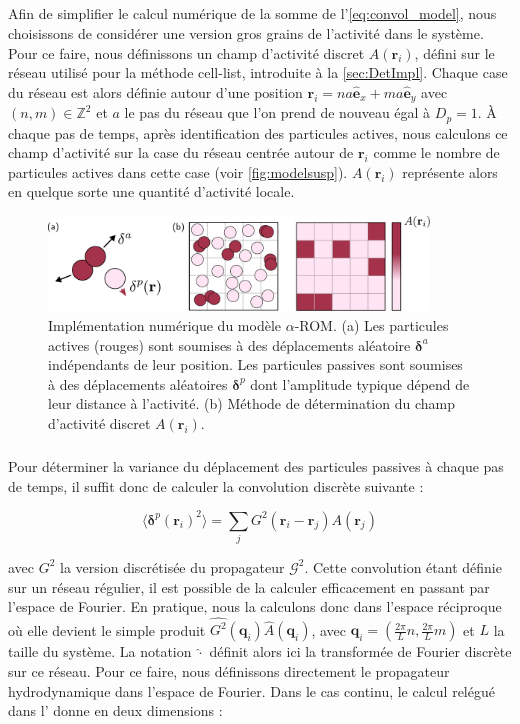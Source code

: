 \subparagraph{}Afin de simplifier le calcul numérique de la somme de l'\autoref{eq:convol_model}, nous choisissons de considérer une version gros grains de l'activité dans le système. Pour ce faire, nous définissons un champ d'activité discret $A(\mathbf{r}_i)$, défini sur le réseau utilisé pour la méthode cell-list, introduite à la \autoref{sec:DetImpl}. Chaque case du réseau est alors définie autour d'une position $\mathbf{r}_i = na\hat{\mathbf{e}}_x + ma \hat{\mathbf{e}}_y$ avec $(n,m) \in \mathbb{Z}^2$ et $a$ le pas du réseau que l'on prend de nouveau égal à $D_p=1$. \`A chaque pas de temps, après identification des particules actives, nous calculons ce champ d'activité sur la case du réseau centrée autour de $\mathbf{r}_i$ comme le nombre de particules actives dans cette case (voir \autoref{fig:modelsusp}). $A(\mathbf{r}_i)$ représente alors en quelque sorte une quantité d'activité locale.

\begin{figure}[h]
	\centering
	\includegraphics[width=0.9\textwidth]{Chapitre3/Figures/Method/Model.pdf}
	\caption{Implémentation numérique du modèle $\alpha$-ROM. (a) Les particules actives (rouges) sont soumises à des déplacements aléatoire $\boldsymbol\delta^a$ indépendants de leur position. Les particules passives sont soumises à des déplacements aléatoires $\boldsymbol\delta^p$ dont l'amplitude typique dépend de leur distance à l'activité. (b) Méthode de détermination du champ d'activité discret $A(\mathbf{r}_i)$.}
	\label{fig:modelsusp}
\end{figure}

\subparagraph{}Pour déterminer la variance du déplacement des particules passives à chaque pas de temps, il suffit donc de calculer la convolution discrète suivante :

\begin{equation}
	\langle \boldsymbol\delta^p(\mathbf{r}_i)^2\rangle = \sum_{j} G^2(\mathbf{r}_i-\mathbf{r}_j) A(\mathbf{r}_j)
	\label{eq:kick_discret}
\end{equation}

\noindent avec $G^2$ la version discrétisée du propagateur $\mathcal{G}^2$. Cette convolution étant définie sur un réseau régulier, il est possible de la calculer efficacement en passant par l'espace de Fourier. En pratique, nous la calculons donc dans l'espace réciproque où elle devient le simple produit $\hat{G^2}(\mathbf{q}_i)\hat{A}(\mathbf{q}_i)$, avec $\mathbf{q}_i = (\frac{2\pi}{L}n, \frac{2\pi}{L}m)$ et $L$ la taille du système. La notation $\hat{\cdot}$ définit alors ici la transformée de Fourier discrète sur ce réseau. Pour ce faire, nous définissons directement le propagateur hydrodynamique dans l'espace de Fourier. Dans le cas continu, le calcul relégué dans l' donne en deux dimensions :

